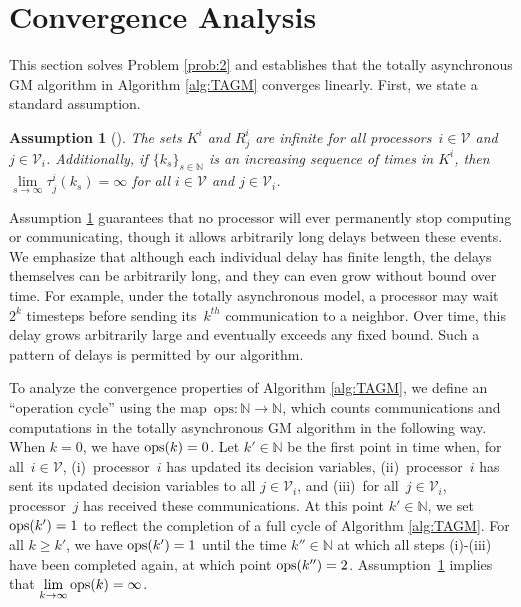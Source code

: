 \documentclass[9pt,shortpaper,twoside,web]{ieeecolor}
\newcommand{\Z}{\ensuremath{\mathcal{Z}}\xspace}
\newcommand{\V}{\ensuremath{\mathcal{V}}\xspace}
\newcommand{\ops}[1]{\textnormal{ops}(#1)}
\newcommand{\blue}[1]{{\textcolor{blue}{#1}}}
\newtheorem{assumption}{Assumption}
\begin{document}
\section{Convergence Analysis}
This section solves Problem \ref{prob:2} and establishes that the totally asynchronous GM algorithm in Algorithm \ref{alg:TAGM} converges linearly.
First, we state a standard 
assumption. 

\begin{assumption}[\cite{bertsekas1989parallel}]\label{ass:TA}
    The sets $K^i$ and $R^i_j$ are infinite for all processors~$i \in \V$ and~$j \in \V_i$.
    Additionally, if $\{k_s\}_{s\in \mathbb{N}}$ is an increasing sequence of times in $K^i$, then
    $\lim\limits_{s\rightarrow\infty}\tau^i_j(k_s)=\infty$ for all $i\in\V$ and $j\in\V_i$.
\end{assumption}

Assumption \ref{ass:TA} guarantees that no processor will ever permanently 
stop computing or communicating, though it allows arbitrarily long delays between these events.
We emphasize that although each individual delay has finite length, the delays themselves can be arbitrarily long, and they can even grow without bound over time. 
For example, under the totally asynchronous model, a processor may wait~$2^k$ timesteps
before sending its~$k^{th}$ communication to a neighbor. 
Over time, this delay grows arbitrarily large and eventually exceeds any fixed bound. 
Such a pattern of delays is permitted by our algorithm.

To analyze the convergence properties of Algorithm \ref{alg:TAGM}, we define an ``operation cycle'' 
using the map~$\text{ops}:\mathbb{N}\rightarrow \mathbb{N}$, 
which counts communications and computations in the totally asynchronous GM algorithm in the following
way.
When $k=0$, we have $\ops k=0$.
Let $k'\in\mathbb N$ be the first point in time when, for all~$i \in \V$, 
(i)~processor~$i$ has updated its decision variables, 
(ii)~processor~$i$ has sent its updated decision variables to all $j\in\V_i$, 
and 
(iii)~for all~$j \in \V_i$, processor~$j$
has received these communications. 
At this point $k'\in\mathbb N$, we set $\ops {k'}=1$ to reflect the completion of a full cycle of Algorithm \ref{alg:TAGM}.
For all $k\geq k'$, we have $\ops{k'}=1$ until the time $k'' \in \mathbb{N}$ 
at which all steps (i)-(iii) have been completed again, at which point $\ops{k''} = 2$.
Assumption~\ref{ass:TA} implies that
$\lim\limits_{k\rightarrow\infty}\ops{k}=\infty$.
\end{document}
